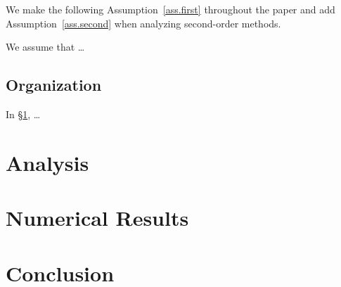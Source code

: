We make the following Assumption~\ref{ass.first} throughout the paper and add Assumption~\ref{ass.second} when analyzing second-order methods.

\bassumption\label{ass.first}
  We assume that \dots
\eassumption

\subsection{Organization}

In \S\ref{sec.analysis}, \dots

\section{Analysis}\label{sec.analysis}

\section{Numerical Results}\label{sec.numerical}

\section{Conclusion}\label{sec.conclusion}
